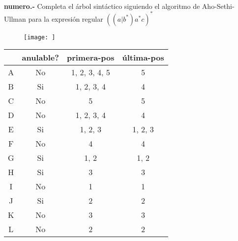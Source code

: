 \paragraph{}
\textbf{{numero}.-} Completa el árbol sintáctico siguiendo el algoritmo de Aho-Sethi-Ullman para la expresión regular $ ((a|b^*)a^*c)^* $
\begin{figure}[ht!]
\centering
\texttt{[image: ]}
\end{figure}

\begin{tabular} {| c | c | c | c |}\hline
 & anulable? & primera-pos & última-pos\\ \hline
A & No & 1, 2, 3, 4, 5 & 5\\ \hline
B & Si & 1, 2, 3, 4 & 4\\ \hline
C & No & 5 & 5\\ \hline
D & No & 1, 2, 3, 4 & 4\\ \hline
E & Si & 1, 2, 3 & 1, 2, 3\\ \hline
F & No & 4 & 4\\ \hline
G & Si & 1, 2 & 1, 2\\ \hline
H & Si & 3 & 3\\ \hline
I & No & 1 & 1\\ \hline
J & Si & 2 & 2\\ \hline
K & No & 3 & 3\\ \hline
L & No & 2 & 2\\ \hline
\end{tabular}